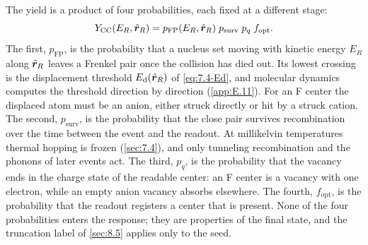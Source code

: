 The yield is a product of four probabilities, each fixed at a different stage:
\begin{equation}
  Y_{\mathrm{CC}}(E_R,\hat{\bm{r}}_R) = p_{\mathrm{FP}}(E_R,\hat{\bm{r}}_R)\;p_{\mathrm{surv}}\;p_q\;f_{\mathrm{opt}} .
  \label{eq:16.6-yield}
\end{equation}
The first, $p_{\mathrm{FP}}$, is the probability that a nucleus set moving with kinetic energy $E_R$ along $\hat{\bm{r}}_R$ leaves a Frenkel pair once the collision has died out. Its lowest crossing is the displacement threshold $E_{\mathrm{d}}(\hat{\bm{r}}_R)$ of \cref{eq:7.4-Ed}, and molecular dynamics computes the threshold direction by direction (\cref{app:E.11}). For an F center the displaced atom must be an anion, either struck directly or hit by a struck cation. The second, $p_{\mathrm{surv}}$, is the probability that the close pair survives recombination over the time between the event and the readout. At millikelvin temperatures thermal hopping is frozen (\cref{sec:7.4}), and only tunneling recombination and the phonons of later events act. The third, $p_q$, is the probability that the vacancy ends in the charge state of the readable center: an F center is a vacancy with one electron, while an empty anion vacancy absorbs elsewhere. The fourth, $f_{\mathrm{opt}}$, is the probability that the readout registers a center that is present. None of the four probabilities enters the response; they are properties of the final state, and the truncation label of \cref{sec:8.5} applies only to the seed.

